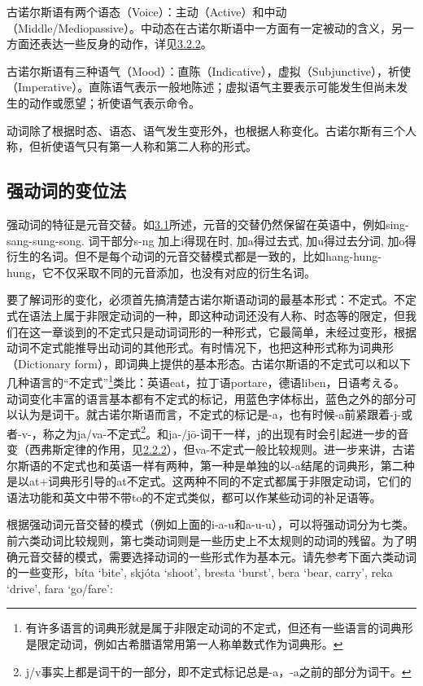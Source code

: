古诺尔斯语有两个语态（Voice）：主动（Active）和中动（Middle/Mediopassive）。中动态在古诺尔斯语中一方面有一定被动的含义，另一方面还表达一些反身的动作，详见\hyperref[ux5f3aux52a8ux8bcdux7684ux4e2dux52a8ux8bcdux5c3e]{3.2.2}。

古诺尔斯语有三种语气（Mood）：直陈（Indicative），虚拟（Subjunctive），祈使（Imperative）。直陈语气表示一般地陈述；虚拟语气主要表示可能发生但尚未发生的动作或愿望；祈使语气表示命令。

动词除了根据时态、语态、语气发生变形外，也根据人称变化。古诺尔斯有三个人称，但祈使语气只有第一人称和第二人称的形式。

\subsection{强动词的变位法}\label{ux5f3aux52a8ux8bcdux7684ux53d8ux4f4dux6cd5}

强动词的特征是元音交替。如\hyperref[ux52a8ux8bcdux7684ux6982ux8ff0]{3.1}所述，元音的交替仍然保留在英语中，例如sing-sang-sung-song.
词干部分s-ng 加上i得现在时, 加a得过去式, 加u得过去分词,
加o得衍生的名词。但不是每个动词的元音交替模式都是一致的，比如hang-hung-hung，它不仅采取不同的元音添加，也没有对应的衍生名词。

要了解词形的变化，必须首先搞清楚古诺尔斯语动词的最基本形式：不定式。不定式在语法上属于非限定动词的一种，即这种动词还没有人称、时态等的限定，但我们在这一章谈到的不定式只是动词词形的一种形式，它最简单，未经过变形，根据动词不定式能推导出动词的其他形式。有时情况下，也把这种形式称为词典形（Dictionary
form），即词典上提供的基本形态。古诺尔斯语的不定式可以和以下几种语言的``不定式''\footnote{有许多语言的词典形就是属于非限定动词的不定式，但还有一些语言的词典形是限定动词，例如古希腊语常用第一人称单数式作为词典形。}类比：英语eat，拉丁语portare，德语liben，日语考える。动词变化丰富的语言基本都有不定式的标记，用蓝色字体标出，蓝色之外的部分可以认为是词干。就古诺尔斯语而言，不定式的标记是-a，也有时候-a前紧跟着-j-或者-v-，称之为ja/va-不定式\footnote{j/v事实上都是词干的一部分，即不定式标记总是-a，-a之前的部分为词干。}。和ja-/jō-词干一样，j的出现有时会引起进一步的音变（西弗斯定律的作用，见\hyperref[ajawa-ux8bcdux5e72]{2.2.2}），但va-不定式一般比较规则。进一步来讲，古诺尔斯语的不定式也和英语一样有两种，第一种是单独的以-a结尾的词典形，第二种是以at+词典形引导的at不定式。这两种不同的不定式都属于非限定动词，它们的语法功能和英文中带不带to的不定式类似，都可以作某些动词的补足语等。

根据强动词元音交替的模式（例如上面的i-a-u和a-u-u），可以将强动词分为七类。前六类动词比较规则，第七类动词则是一些历史上不太规则的动词的残留。为了明确元音交替的模式，需要选择动词的一些形式作为基本元。请先参考下面六类动词的一些变形，bíta
`bite', skjóta `shoot', bresta `burst', bera `bear, carry', reka
`drive‌', fara `go/fare‌':

